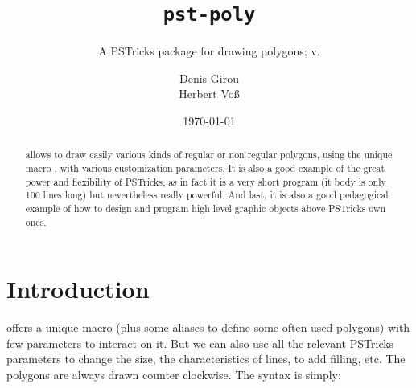 \documentclass[11pt,english,BCOR10mm,DIV12,bibliography=totoc,parskip=false,smallheadings
    headexclude,footexclude,oneside]{pst-doc}
\let\pstDocFV\fileversion
\begin{document}
\title{\texttt{pst-poly}}
\subtitle{A PSTricks package for drawing polygons; v.\pstDocFV}
\author{Denis Girou\\Herbert Vo\ss}
\date{\today}
\maketitle

\tableofcontents

\clearpage

\begin{abstract}
\noindent
{} allows to draw easily various kinds of regular or non regular
polygons, using the unique macro , with various customization
parameters.
It is also a good example of the great power and flexibility of PSTricks,
as in fact it is a very short program (it body is only 100 lines long) but
nevertheless really powerful.
    And last, it is also a good pedagogical example of how to design and
program high level graphic objects above PSTricks own ones.
\end{abstract}

\clearpage

\section{Introduction}
%
 offers a unique macro (plus some aliases to define
some often used polygons) with few parameters to interact on it. But we can
also use all the relevant PSTricks parameters to change the size, the
characteristics of lines, to add filling, etc.
The polygons are always drawn counter clockwise.
%
The syntax is simply:
\begin{BDef}
\OptArgs\\
\OptArgs\\
\OptArgs\\
\OptArgs\\
\OptArgs\\
\OptArgs\\
\OptArgs\\
\OptArgs\\
\OptArgs\\
\OptArgs\\%
\OptArgs\\
\OptArgs\\
\OptArgs{}\\
\end{BDef}
\end{document}
